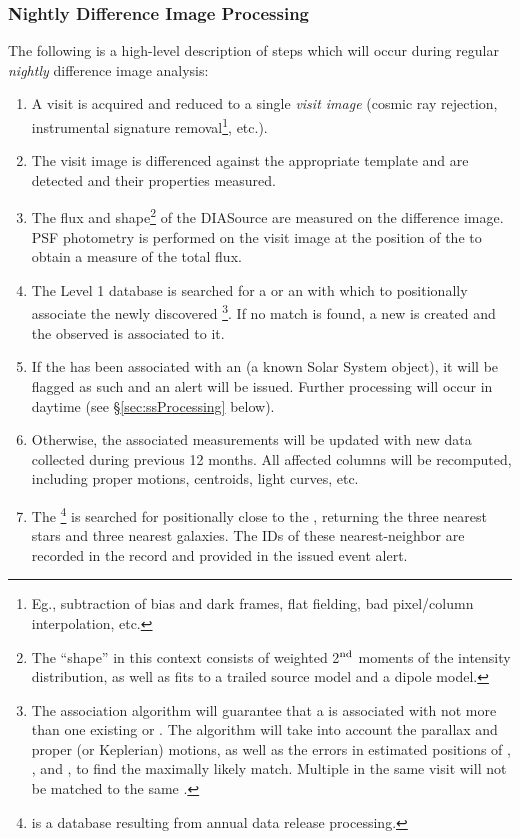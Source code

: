 \subsubsection{Nightly Difference Image Processing}

The following is a high-level description of steps which will occur during regular {\em nightly}
difference image analysis:
\begin{enumerate}
\item A visit is acquired and reduced to a single {\em visit image} (cosmic ray rejection, instrumental signature removal\footnote{Eg., subtraction of bias and dark frames, flat fielding, bad pixel/column interpolation, etc.}, etc.).
\item The visit image is differenced against the appropriate template and \DIASources are detected and
their properties measured.
\item The flux and shape\footnote{The ``shape'' in this context consists of weighted 2$^{\rm nd}$ moments
of the intensity distribution, as well as fits to a trailed source model and a dipole model.} of the DIASource are measured on the difference image. PSF photometry is performed on the visit image at the position of the \DIASource to obtain a measure of the total flux.
\item The Level 1 database is searched for a \DIAObject or an \SSObject with which to positionally associate the newly discovered \DIASource\footnote{The association algorithm will guarantee that a \DIASource is associated with not more than one existing \DIAObject or \SSObject. The algorithm will take into account the parallax and proper (or Keplerian) motions, as well as the errors in estimated positions of \DIAObject, \SSObject, and \DIASource, to find the maximally likely match. Multiple \DIASources in the same visit will not be matched to the same \DIAObject.}. If no match is found, a new \DIAObject is created and the observed \DIASource is associated to it.
\item If the \DIASource has been associated with an \SSObject (a known Solar System object), it will be flagged as such and an alert will be issued. Further processing will occur in daytime (see \S\ref{sec:ssProcessing} below).
\item Otherwise, the associated \DIAObject measurements will be updated with new data
collected during previous 12 months. All affected columns will be recomputed, including proper motions, centroids, light curves, etc.
\item The \DR\footnote{\DR is a database resulting from annual data release processing.} is searched for \Objects positionally close to the \DIAObject, returning the three nearest stars and three nearest galaxies. The IDs of these nearest-neighbor \Objects are recorded in the \DIAObject record and provided in the issued event alert.

\end{enumerate}
